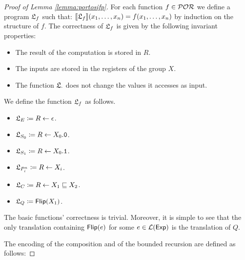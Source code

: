 \begin{proof}[Proof of Lemma \ref{lemma:portosifp}]
For each function $f \in \mathcal{POR}$ we define a program ${\mathfrak L_{f}}$ such that:
$\llbracket {\mathfrak L_{f}}\rrbracket(x_1, \ldots, x_n)=f(x_1, \ldots, x_n)$
by induction on the structure of $f$.
The correctness of ${\mathfrak L_{f}}$
is given by the following invariant properties:
\begin{itemize}
\item The result of the computation is stored in $R$.
\item The inputs are stored in the registers of the group $X$.
\item The function ${\mathfrak L_{\cdot}}$ does not change the values it accesses as input.
\end{itemize}
\noindent
We define the function ${\mathfrak L_{f}}$ as follows.
\begin{itemize}
\item ${\mathfrak L_{E}}\coloneqq R \leftarrow \epsilon$.
\item ${\mathfrak L_{S_0}}\coloneqq R \leftarrow X_0.\mathtt{0}$.
\item ${\mathfrak L_{S_1}}\coloneqq R \leftarrow X_0.\mathtt{1}$.
\item ${\mathfrak L_{{P}^n_i}}\coloneqq R \leftarrow X_i$.
\item ${\mathfrak L_{C}}\coloneqq R \leftarrow X_1 \sqsubseteq X_2$.
\item ${\mathfrak L_{Q}}\coloneqq \mathsf{Flip(}X_1\mathsf{)}$.
\end{itemize}

The basic functions' correctness is trivial. Moreover, it is simple to see that
the only translation containing $\mathsf{Flip(}e\mathsf{)}$ for some $e \in {\mathcal L ({\mathsf{Exp}})}$ is
the translation of $Q$.

The encoding of the composition and of the bounded recursion are defined as follows:


\end{proof}
